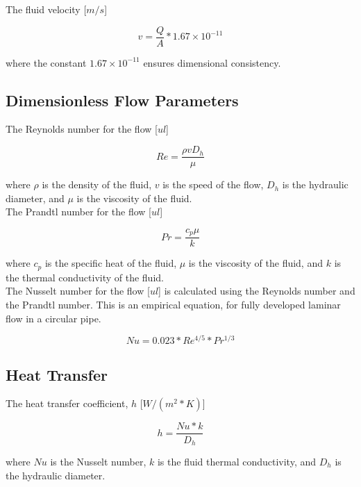 \documentclass{article}
\begin{document}
The fluid velocity [$m/s$]

\begin{equation}
	v = \frac{Q}{A} * 1.67 \times 10^{-11}
\end{equation}

where the constant $1.67 \times 10^{-11}$ ensures dimensional consistency.

\subsection{Dimensionless Flow Parameters}

The Reynolds number for the flow [$ul$]

\begin{equation}
	Re = \frac{ \rho v D_h }{ \mu }
\end{equation}

where $\rho$ is the density of the fluid, $v$ is the speed of the flow, $D_h$ is the hydraulic diameter, and $\mu$ is the viscosity of the fluid. \\

The Prandtl number for the flow [$ul$]

\begin{equation}
	Pr = \frac{c_p\mu}{k}
\end{equation}

where $c_p$ is the specific heat of the fluid, $\mu$ is the viscosity of the fluid, and $k$ is the thermal conductivity of the fluid. \\

The Nusselt number for the flow [$ul$] is calculated using the Reynolds number and the Prandtl number. This is an empirical equation, for fully developed laminar flow in a circular pipe.

\begin{equation}
	Nu = 0.023 * Re^{4/5} * Pr^{1/3}
\end{equation}

\subsection{Heat Transfer}

The heat transfer coefficient, $h$ [$W/(m^2*K)$]

\begin{equation}
	h = \frac{Nu*k}{D_h}
\end{equation}

where $Nu$ is the Nusselt number, $k$ is the fluid thermal conductivity, and $D_h$ is the hydraulic diameter. \\
\end{document}
